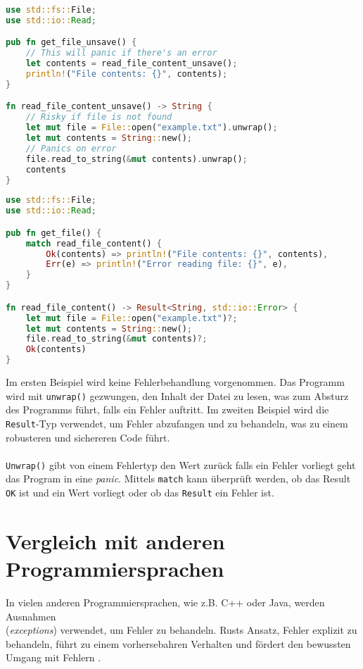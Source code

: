 \begin{lstlisting}[language=Rust, caption=Unsichere Fehlerbehandlung]
use std::fs::File;
use std::io::Read;

pub fn get_file_unsave() {
    // This will panic if there's an error
    let contents = read_file_content_unsave(); 
    println!("File contents: {}", contents);
}

fn read_file_content_unsave() -> String {
    // Risky if file is not found
    let mut file = File::open("example.txt").unwrap();  
    let mut contents = String::new();
    // Panics on error
    file.read_to_string(&mut contents).unwrap();  
    contents
}
\end{lstlisting}
\cleardoublepage
\begin{lstlisting}[language=Rust, caption=Sichere Fehlerbehandlung]
use std::fs::File;
use std::io::Read;

pub fn get_file() {
    match read_file_content() {
        Ok(contents) => println!("File contents: {}", contents),
        Err(e) => println!("Error reading file: {}", e),
    }
}

fn read_file_content() -> Result<String, std::io::Error> {
    let mut file = File::open("example.txt")?;
    let mut contents = String::new();
    file.read_to_string(&mut contents)?;
    Ok(contents)
}
\end{lstlisting}
\noindent
Im ersten Beispiel wird keine Fehlerbehandlung vorgenommen. 
Das Programm wird mit \texttt{unwrap()} gezwungen, den Inhalt der Datei zu lesen, was zum Absturz des Programms führt, falls ein Fehler auftritt. Im zweiten Beispiel wird die \texttt{Result}-Typ verwendet, um Fehler abzufangen und zu behandeln, was zu einem robusteren und sichereren Code führt.\\
\\
\texttt{Unwrap()} gibt von einem Fehlertyp den Wert zurück falls ein Fehler vorliegt geht das Program in eine \textit{\gls{panic}}. 
Mittels \texttt{match} kann überprüft werden, ob das Result \texttt{OK} ist und ein Wert vorliegt oder ob das \texttt{Result} ein Fehler ist.

\section{Vergleich mit anderen Programmiersprachen}
In vielen anderen Programmiersprachen, wie z.B. C++ oder Java, werden Ausnahmen \\ (\textit{\glspl{exception}}) verwendet, um Fehler zu behandeln. 
Rusts Ansatz, Fehler explizit zu behandeln, führt zu einem vorhersebahren Verhalten und fördert den bewussten Umgang mit Fehlern \cite[Kapitel 9]{rust2023}.

